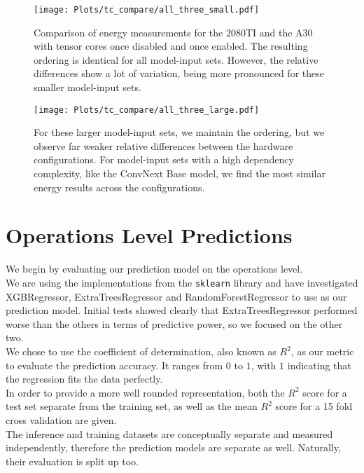 \begin{figure}
    \center\texttt{[image: Plots/tc\_compare/all\_three\_small.pdf]}
    \caption{Comparison of energy measurements for the 2080TI and the A30 with tensor cores once disabled and once enabled. The resulting ordering is identical for all model-input sets. However, the relative differences show a lot of variation, being more pronounced for these smaller model-input sets.}
    \label{fig:tcnotcsmall}
    \texttt{[image: Plots/tc\_compare/all\_three\_large.pdf]}
    \caption{For these larger model-input sets, we maintain the ordering, but we observe far weaker relative differences between the hardware configurations. For model-input sets with a high dependency complexity, like the ConvNext Base model, we find the most similar energy results across the configurations.}
    \label{fig:tcnotclarge}
\end{figure}

\FloatBarrier


\section{Operations Level Predictions}



We begin by evaluating our prediction model on the operations level. \\
We are using the implementations from the \texttt{sklearn} library and have investigated XGBRegressor, ExtraTreesRegressor and RandomForestRegressor to use as our prediction model. Initial tests showed clearly that ExtraTreesRegressor performed worse than the others in terms of predictive power, so we focused on the other two. \\
We chose to use the coefficient of determination, also known as $R^2$, as our metric to evaluate the prediction accuracy. It ranges from $0$ to $1$, with $1$ indicating that the regression fits the data perfectly. \\
In order to provide a more well rounded representation, both the $R^2$ score for a test set separate from the training set, as well as the mean $R^2$ score for a 15 fold cross validation are given. \\
The inference and training datasets are conceptually separate and measured independently, therefore the prediction models are separate as well. Naturally, their evaluation is split up too.


